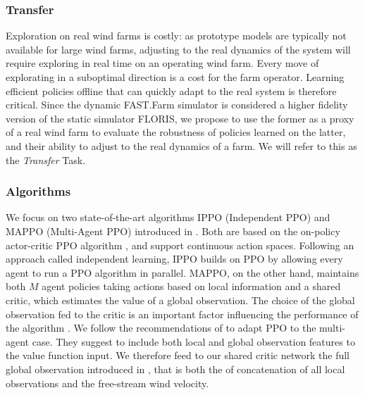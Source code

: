 \documentclass{article}
\newcommand{\md}[1]{{\color{red}#1}}
\begin{document}
\subsubsection{Transfer}\label{sec:bench-transfer}
Exploration on real wind farms is costly: as prototype models are typically not available for large wind farms, adjusting to the real dynamics of the system will require exploring in real time on an operating wind farm. Every move of explorating in a suboptimal direction is a cost for the farm operator. Learning efficient policies offline that can quickly adapt to the real system is therefore critical. Since the dynamic FAST.Farm simulator is considered a higher fidelity version of the static simulator FLORIS, we propose to use the former as a proxy of a real wind farm to evaluate the robustness of policies learned on the latter, and their ability to adjust to the real dynamics of a farm. We will refer to this as the \textit{Transfer} Task.
%
%

\subsubsection{Algorithms}\label{sec:bench-algos}

We focus on two 
state-of-the-art
algorithms IPPO (Independent PPO) and MAPPO (Multi-Agent PPO) introduced in \cite{de2020independent, yu2022surprising}. Both are based on the on-policy actor-critic PPO algorithm \cite{schulman2017proximal}, and support continuous action spaces. Following an approach called independent learning, IPPO builds on PPO by allowing every agent to run a PPO algorithm in parallel. MAPPO, on the other hand, maintains both $M$ agent policies taking actions based on local information and a shared critic, which estimates the value of a global observation.  The choice of the global observation fed to the critic is an important factor influencing the performance of the algorithm \cite{yu2022surprising}. We follow the recommendations of \cite{yu2022surprising} to adapt PPO to the multi-agent case. They suggest to include both local and global observation features to the value function input. We therefore feed to our shared critic network the full global observation introduced in , that is both the of concatenation of all local observations and the free-stream wind velocity.
\end{document}
